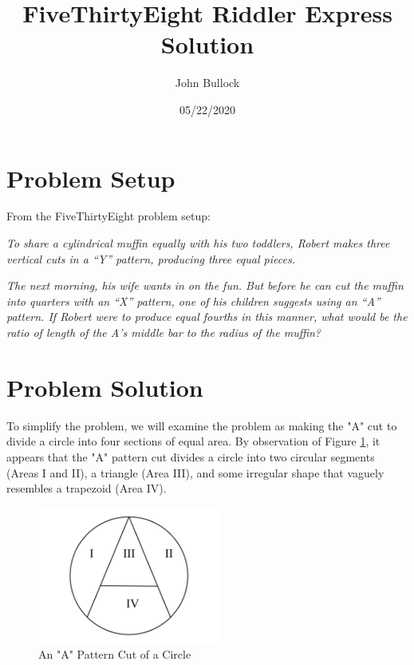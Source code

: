 \documentclass[a4paper,11pt]{article}
\begin{document}
\title{FiveThirtyEight Riddler Express Solution}


\author{John Bullock}

\date{05/22/2020}

\graphicspath{{Images/}}

\maketitle
\section*{Problem Setup}

From the FiveThirtyEight problem setup:\newline

\textit{To share a cylindrical muffin equally with his two toddlers, Robert makes three vertical cuts in a “Y” pattern, producing three equal pieces.}

\textit{The next morning, his wife wants in on the fun. But before he can cut the muffin into quarters with an “X” pattern, one of his children suggests using an “A” pattern. If Robert were to produce equal fourths in this manner, what would be the ratio of length of the A’s middle bar to the radius of the muffin?}


\section*{Problem Solution}

To simplify the problem, we will examine the problem as making the "A" cut to divide a circle into four sections of equal area.  By observation of Figure \ref{fig:areas}, it appears that the "A" pattern cut divides a circle into two circular segments (Areas I and II), a triangle (Area III), and some irregular shape that vaguely resembles a trapezoid (Area IV).

\begin{figure}[htp]
    \centering
    \includegraphics[width=6cm]{Images/2020_05_22_Riddler_Express.png}
    \caption{An "A" Pattern Cut of a Circle}
    \label{fig:areas}
\end{figure}
\end{document}
